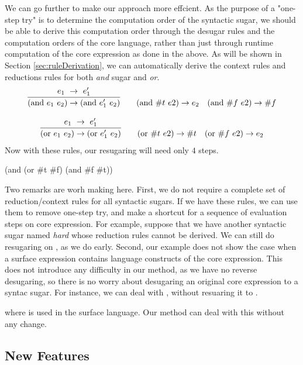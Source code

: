 We can go further to make our approach more effcient. As the purpose of a "one-step try" is to determine the computation order of the syntactic sugar, we should be able to derive this computation order through the desugar rules and the computation orders of the core language, rather than just through runtime computation of the core expression as done in the above. As will be shown in Section \ref{sec:ruleDerivation}, we can automatically derive the context rules and reductions rules for both \emph{and} sugar and \emph{or}.
\[
\begin{array}{c}
\infer {(\mbox{and}~e_1~e_2) \rightarrow (\mbox{and}~e_1'~e_2)} {e_1~ \rightarrow~e_1'}
\qquad
(\mbox{and}~\#t~e2) \rightarrow e_2
\quad
(\mbox{and}~\#f~e2) \rightarrow \#f \\
\\
\infer {(\mbox{or}~e_1~e_2) \rightarrow (\mbox{or}~e_1'~e_2)} {e_1~ \rightarrow~e_1'}
\qquad
(\mbox{or}~\#t~e2) \rightarrow \#t
\quad
(\mbox{or}~\#f~e2) \rightarrow e_2 \\
\end{array}
\]
Now with these rules, our resugaring will need only $4$ steps.
\begin{Codes}
    (and (or \#t \#f) (and \#f \#t))
\end{Codes}

Two remarks are worh making here. First, we do not require a complete set of reduction/context rules for all syntactic sugars. If we have these rules, we can use them to remove one-step try, and make a shortcut for a sequence of evaluation steps on core expression.
For example, suppose that we have another syntactic sugar named \emph{hard} whose reduction rules cannot be derived.
We can still do resugaring on , as we do early.
Second, our example does not show the case when a surface expression contains language constructs of the core expression. This does not introduce any difficulty in our method, as we have no reverse desugaring, so there is no worry about desugaring an original core expression to a syntac sugar. For instance, we can deal with , without resuaring it to .

where  is used in the surface language. Our method can deal with this without any change.

\subsection{New Features}

